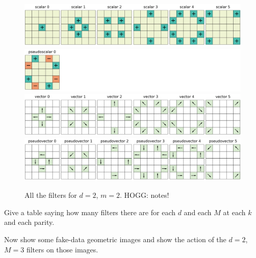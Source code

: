 \documentclass{article}
\theoremstyle{plain}
\begin{document}
\begin{figure}[tp]
  \begin{mdframed}
  \color{captiongray}
  \begin{center}
\includegraphics[width=\textwidth]{notebooks/filter+0_2_5.png}\\
\includegraphics[width=\textwidth]{notebooks/filter-0_2_5.png}\\
\includegraphics[width=\textwidth]{notebooks/filter+1_2_5.png}\\
\includegraphics[width=\textwidth]{notebooks/filter-1_2_5.png}
  \end{center}
\caption{All the filters for $d=2$, $m=2$. HOGG: notes!}
  \end{mdframed}
\end{figure}

Give a table saying how many filters there are for each $d$ and each $M$ at each $k$ and each parity.

Now show some fake-data geometric images and show the action of the $d=2$, $M=3$ filters on those images.
\end{document}

